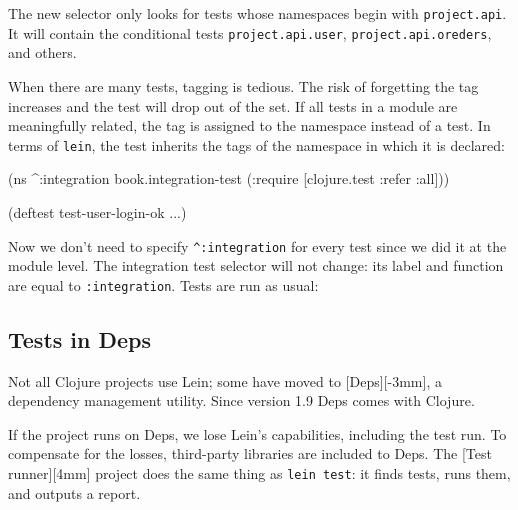 \fi

The new selector only looks for tests whose namespaces begin with \verb|project.api|. It will contain the conditional tests \verb|project.api.user|, \verb|project.api.oreders|, and others.

When there are many tests, tagging is tedious. The risk of forgetting the tag increases and the test will drop out of the set. If all tests in a module are meaningfully related, the tag is assigned to the namespace instead of a test. In terms of \verb|lein|, the test inherits the tags of the namespace in which it is declared:

\begin{english}
  \begin{clojure}
(ns ^:integration
  book.integration-test
  (:require [clojure.test :refer :all]))

(deftest test-user-login-ok
  ...)
  \end{clojure}
\end{english}

Now we don't need to specify \verb|^:integration| for every test since we did it at the module level. The integration test selector will not change: its label and function are equal to \verb|:integration|. Tests are run as usual:

\begin{english}
\end{english}

\subsection{Tests in Deps}


Not all Clojure projects use Lein; some have moved to [Deps][-3mm], a dependency management utility. Since version 1.9 Deps comes with Clojure.


If the project runs on Deps, we lose Lein's capabilities, including the test run. To compensate for the losses, third-party libraries are included to Deps. The [Test runner][4mm] project does the same thing as \verb|lein test|: it finds tests, runs them, and outputs a report.

